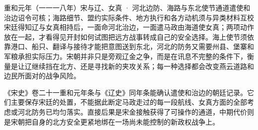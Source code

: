 \begin{event}{}{重和元年（一一一八年）}{宋与辽、女真 · 河北边防、海路与东北使节通道}{遣使和治边诏令可核；海路细节、盟约实际条件、地方执行和各方动机须与异类材料互校}
宋廷得知辽与女真相持后，一面命河北治边，一面遣马政由海道使女真；两项动作放在一起，才看得见开封如何试图把远方战事转成自己的安全选择。海上使节须依靠港口、船只、翻译与接待才能把意图送到东北，河北的防务又需要州县、堡寨和军粮承担实际压力。宋朝并非只是旁观辽金之争，而是在讯息不完整的条件下，衡量是让辽继续挡在北方、还是寻找新的夹攻关系；每一种选择都会改变燕云道路和边民所面对的战争风险。

《宋史》卷二十一重和元年条与《辽史》同年条能确认遣使和治边的朝廷记录。它们主要保存宋廷的处置，不能据此断定马政走过的每一段航线、女真方面的全部考虑或河北防务已均匀落实。直接后果是宋金接触获得了可操作的通道，中期代价则是宋朝把自身的北方安全更紧地绑在一场尚未能控制的新政权战争上。
\end{event}
